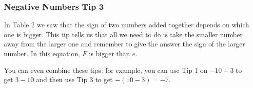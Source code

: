             \subsubsection{ Negative Numbers Tip 3}
            \nopagebreak
          \label{m38346*id175117}In Table 2 we saw that the sign of two numbers added
together depends on which one is bigger. This tip tells us that all we need to
do is take the smaller number away from the larger one and remember to give
the answer the sign of the larger number. In this equation, $F$ is bigger than $e$.\par 
          \label{m38346*uid32}\nopagebreak\noindent{}
          \label{m38346*id175232}You can even combine these tips: for example, you can use Tip 1 on
$-10+3$ to get $3-10$ and then use Tip 3 to get $-\left(10-3\right)=-7$.\par 
\label{m38346*secfhsst!!!underscore!!!id1324}
